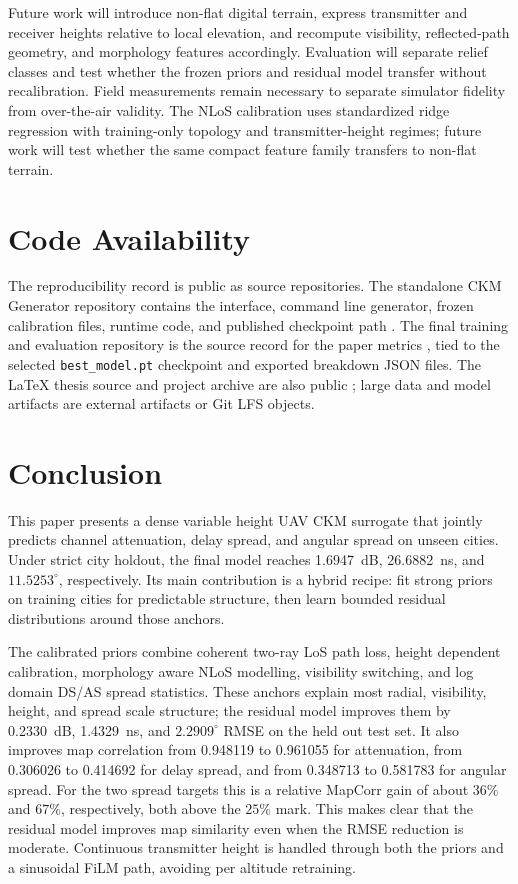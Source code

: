 \documentclass[journal]{IEEEtran}
\begin{document}
Future work will introduce non-flat digital terrain, express transmitter and
receiver heights relative to local elevation, and recompute visibility,
reflected-path geometry, and morphology features accordingly. Evaluation will
separate relief classes and test whether the frozen priors and residual model
transfer without recalibration. Field measurements remain necessary to
separate simulator fidelity from over-the-air validity. The NLoS calibration
uses standardized ridge regression with training-only topology and
transmitter-height regimes; future work will test whether the same compact
feature family transfers to non-flat terrain.

\section{Code Availability}

The reproducibility record is public as source repositories. The standalone CKM
Generator repository contains the interface, command line generator, frozen
calibration files, runtime code, and published checkpoint path
\cite{moreno2026ckmgenerator}. The final training and evaluation repository is
the source record for the paper metrics \cite{moreno2026finalcode}, tied to the
selected \texttt{best\_model.pt} checkpoint and exported breakdown JSON files.
The LaTeX thesis source and project archive are also public
\cite{moreno2026tfgprogress,moreno2026tfgtext}; large data and model artifacts
are external artifacts or Git LFS objects.

\section{Conclusion}

This paper presents a dense variable height UAV CKM surrogate that jointly
predicts channel attenuation, delay spread, and angular spread on unseen cities.
Under strict city holdout, the final model reaches \SI{1.6947}{dB},
\SI{26.6882}{ns}, and \(11.5253^\circ\), respectively. Its main contribution is
a hybrid recipe: fit strong priors on training cities for predictable structure,
then learn bounded residual distributions around those anchors.

The calibrated priors combine coherent two-ray LoS path loss, height dependent
calibration, morphology aware NLoS modelling, visibility switching, and log
domain DS/AS spread statistics. These anchors explain most radial, visibility,
height, and spread scale structure; the residual model improves them by
\SI{0.2330}{dB}, \SI{1.4329}{ns}, and \(2.2909^\circ\) RMSE on the held out
test set. It also improves map correlation from 0.948119 to 0.961055 for
attenuation, from 0.306026 to 0.414692 for delay spread, and from 0.348713 to
0.581783 for angular spread. For the two spread targets this is a relative
MapCorr gain of about \(36\%\) and \(67\%\), respectively, both above the
\(25\%\) mark. This makes clear that the residual model improves map similarity
even when the RMSE reduction is moderate. Continuous transmitter height is
handled through both the priors and a
sinusoidal FiLM path, avoiding per altitude retraining.
\end{document}
